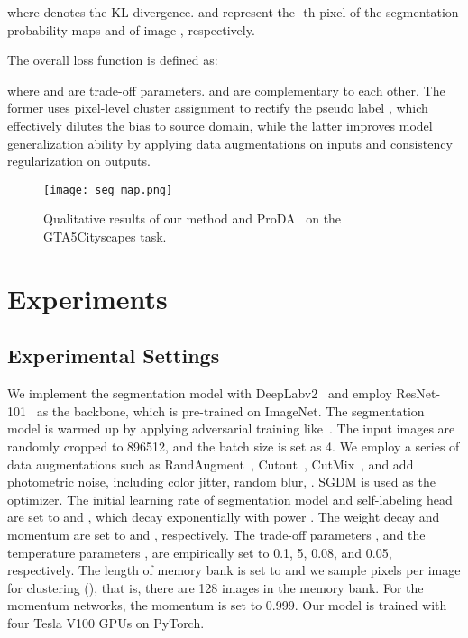 \documentclass[10pt,twocolumn,letterpaper]{article}
\begin{document}
	where  denotes the KL-divergence.  and  represent the -th pixel of the segmentation probability maps  and  of image , respectively. 
	
	The overall loss function is defined as:
	
	where  and  are trade-off parameters.  and  are complementary to each other. The former uses pixel-level cluster assignment  to rectify the pseudo label , which effectively dilutes the bias to source domain, while the latter improves model generalization ability by applying data augmentations on inputs and consistency regularization on outputs. 
	
	\begin{figure*}
		\centering \vspace{-1.5em}
		\texttt{[image: seg\_map.png]}\\
		\vspace{-1.0em}
		\caption{Qualitative results of our method and ProDA~\cite{zhang2021prototypical} on the GTA5Cityscapes task.}
		\label{fig4}
		\vspace{-1.3em}
	\end{figure*}
	
	\section{Experiments}
	\subsection{Experimental Settings}
	We implement the segmentation model with DeepLabv2~\cite{chen2017deeplab} and employ  ResNet-101~\cite{he2016deep} as the backbone, which is pre-trained on ImageNet. The segmentation model is warmed up by applying adversarial training like~\cite{tsai2018learning}.
	The input images are randomly cropped to 896512, and the batch size is set as 4. We employ a series of data augmentations such as RandAugment~\cite{cubuk2020randaugment}, Cutout~\cite{devries2017improved}, CutMix~\cite{yun2019cutmix}, and add photometric noise, including color jitter, random blur, \etc. SGDM is used as the optimizer. The initial learning rate of segmentation model and self-labeling head are set to  and , which decay exponentially with power . The weight decay and momentum are set to  and , respectively. The trade-off parameters ,  and the temperature parameters ,   are empirically set to 0.1, 5, 0.08, and 0.05, respectively. The length of memory bank is set to  and we sample  pixels per image for clustering (), that is, there are 128 images in the memory bank. For the momentum networks, the momentum is set to 0.999. Our model is trained with four Tesla V100 GPUs on PyTorch. 
\end{document}
